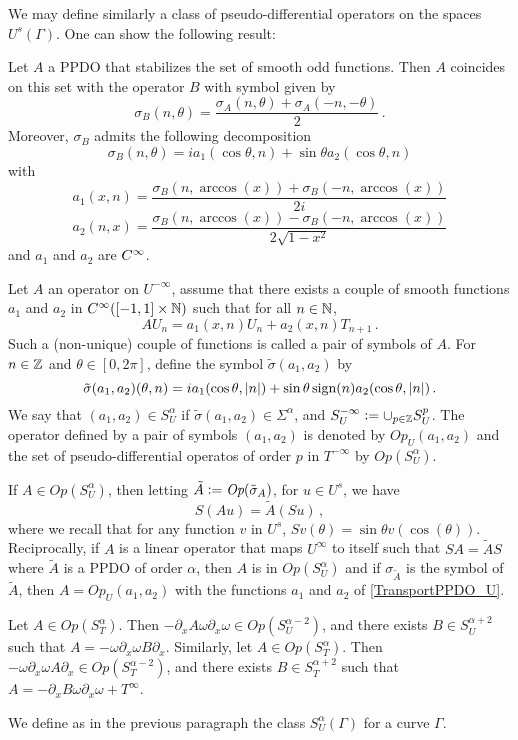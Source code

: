 \documentclass[a4paper]{article}
\begin{document}
We may define similarly a class of pseudo-differential operators on the spaces $U^s(\Gamma)$. One can show the following result:
\begin{Lem}
	\label{TransportPPDO_U}
	Let $A$ a PPDO that stabilizes the set of smooth odd functions. Then $A$ coincides on this set with the operator $B$ with symbol given by 
	\[\sigma_B(n,\theta) = \frac{\sigma_A(n,\theta) + \sigma_A(-n,-\theta)}{2}\,.\]
	Moreover, $\sigma_B$ admits the following decomposition
	\[\sigma_B(n,\theta) = i a_1(\cos\theta,n) + \sin\theta a_2(\cos\theta,n)\]
	with
	\[a_1(x,n) = \frac{\sigma_B(n,\arccos(x)) + \sigma_B(-n,\arccos(x))}{2i}\]
	\[a_2(n,x) = \frac{\sigma_B(n,\arccos(x)) - \sigma_B(-n,\arccos(x))}{2\sqrt{1-x^2}}\] 
	and $a_1$ and $a_2$ are $C^{\infty}$. 
\end{Lem}
Let $A$ an operator on $U^{-\infty}$, assume that there exists a couple of smooth functions $a_1$ and $a_2$ in $C^{\infty}([-1,1]\times \mathbb{N})$ such that for all $n \in \mathbb{N}$,
\[AU_n = a_1(x,n) U_n + a_2(x,n) T_{n+1}\,.\]
Such a (non-unique) couple of functions is called a pair of symbols of $A$. For $n\in \mathbb{Z}$ and $\theta \in [0,2\pi]$, define the symbol $\tilde{\sigma}(a_1,a_2)$ by
\[\tilde{\sigma}(a_1,a_2)(\theta,n) = i a_1(\cos\theta,\left\lvert n \right\rvert) + \sin\theta\,\text{sign}(n) a_2(\cos\theta,\left\lvert n \right\rvert)\,.\]
We say that $(a_1,a_2) \in S^\alpha_U$ if $\tilde{\sigma}(a_1,a_2) \in \Sigma^\alpha$, and $S^{-\infty}_U \mathrel{\mathop:}= \cup_{p \in \mathbb{Z}} S^p_U$. The operator defined by a pair of symbols $(a_1,a_2)$ is denoted by $\textit{Op}_U(a_1,a_2)$ and the set of pseudo-differential operatos of order $p$ in $T^{-\infty}$  by $\textit{Op}(S^\alpha_U)$. 
\begin{Lem}
	If $A \in \textit{Op}(S^\alpha_U)$, then letting $\tilde{A} \mathrel{\mathop:}= \textit{Op}(\tilde{\sigma}_A)$, for $u \in U^s$, we have 
	\[S(Au) = \tilde{A} (Su)\,,\]
	where we recall that for any function $v$ in $U^s$, $Sv(\theta) = \sin\theta v(\cos(\theta))$. 
	Reciprocally, if $A$ is a linear operator that maps $U^\infty$ to itself such that
	$SA = \tilde{A}S$ where $\tilde{A}$ is a PPDO of order $\alpha$, then $A$ is in $\textit{Op}(S^\alpha_U)$ and if $\sigma_{\tilde{A}}$ is the symbol of $\tilde{A}$, then $A = \textit{Op}_U(a_1,a_2)$ with the functions $a_1$ and $a_2$ of \autoref{TransportPPDO_U}.
\end{Lem}

\begin{The}
	Let $A \in \textit{Op}(S^\alpha_T)$. Then $-\partial_x A \omega \partial_x \omega \in \textit{Op}(S^{\alpha-2}_U)$, and there exists $B \in S^{\alpha + 2}_U$ such that $A = -\omega \partial_x \omega B \partial_x$.
	Similarly, let $A \in \textit{Op}(S^\alpha_T)$. Then $-\omega \partial_x \omega A \partial_x  \in \textit{Op}(S^{\alpha-2}_T)$, and there exists $B \in S^{\alpha + 2}_T$ such that $A = -\partial_x B \omega \partial_x \omega + T^\infty$.
\end{The}
We define as in the previous paragraph the class $S^\alpha_U(\Gamma)$ for a curve $\Gamma$. 
\end{document}
